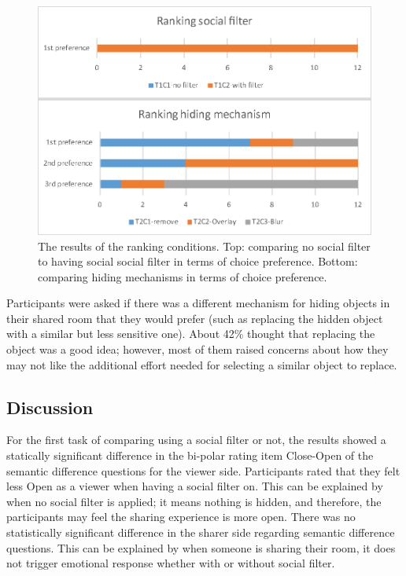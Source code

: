 \begin{figure}[h]
    \begin{center}
    \includegraphics[width=.8\linewidth]{images/54-hiding-frontier18/images-19.eps}
    \caption{The results of the ranking conditions. Top: comparing no social filter to having social social filter in terms of choice preference. Bottom: comparing hiding mechanisms in terms of choice preference.}
    \label{fig:frontier18:result-ranking}
    \end{center}
\end{figure}

Participants were asked if there was a different mechanism for hiding objects in their shared room that they would prefer (such as replacing the hidden object with a similar but less sensitive one). About 42\% thought that replacing the object was a good idea; however, most of them raised concerns about how they may not like the additional effort needed for selecting a similar object to replace.

\subsection{Discussion}

For the first task of comparing using a social filter or not, the results showed a statically significant difference in the bi-polar rating item Close-Open of the semantic difference questions for the viewer side. Participants rated that they felt less Open as a viewer when having a social filter on. This can be explained by when no social filter is applied; it means nothing is hidden, and therefore, the participants may feel the sharing experience is more open. There was no statistically significant difference in the sharer side regarding semantic difference questions. This can be explained by when someone is sharing their room, it does not trigger emotional response whether with or without social filter. 

